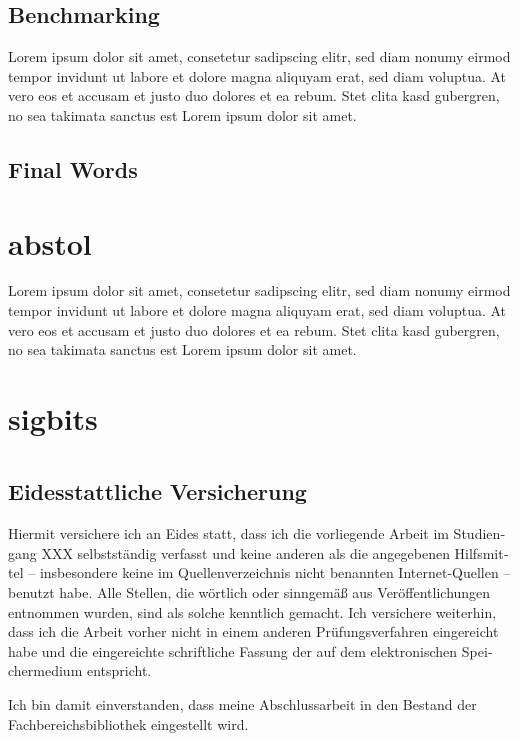 \documentclass[
	12pt,
	a4paper,
	BCOR10mm,
	DIV14,
	headsepline,
]{scrreprt}
\begin{document}
\section{Benchmarking}
Lorem ipsum dolor sit amet, consetetur sadipscing elitr, sed diam nonumy eirmod tempor invidunt ut labore et dolore magna aliquyam erat, sed diam voluptua.
At vero eos et accusam et justo duo dolores et ea rebum.
Stet clita kasd gubergren, no sea takimata sanctus est Lorem ipsum dolor sit amet.

\section{Final Words}




\appendix
\appendixpage

\chapter{abstol}
\label{abstol}

Lorem ipsum dolor sit amet, consetetur sadipscing elitr, sed diam nonumy eirmod tempor invidunt ut labore et dolore magna aliquyam erat, sed diam voluptua.
At vero eos et accusam et justo duo dolores et ea rebum.
Stet clita kasd gubergren, no sea takimata sanctus est Lorem ipsum dolor sit amet.

\chapter{sigbits}
\label{sigbits}

\listoffigures

\lstlistoflistings

\listoftables

\chapter*{}

\thispagestyle{empty}

\section*{Eidesstattliche Versicherung}

\begin{otherlanguage}{ngerman}
Hiermit versichere ich an Eides statt, dass ich die vorliegende Arbeit im Studiengang XXX selbstständig verfasst und keine anderen als die angegebenen Hilfsmittel -- insbesondere keine im Quellenverzeichnis nicht benannten Internet-Quellen -- benutzt habe.
Alle Stellen, die wörtlich oder sinngemäß aus Veröffentlichungen entnommen wurden, sind als solche kenntlich gemacht.
Ich versichere weiterhin, dass ich die Arbeit vorher nicht in einem anderen Prüfungsverfahren eingereicht habe und die eingereichte schriftliche Fassung der auf dem elektronischen Speichermedium entspricht.

\bigskip

\noindent
Ich bin damit einverstanden, dass meine Abschlussarbeit in den Bestand der Fachbereichsbibliothek eingestellt wird.
\end{otherlanguage}
\end{document}
